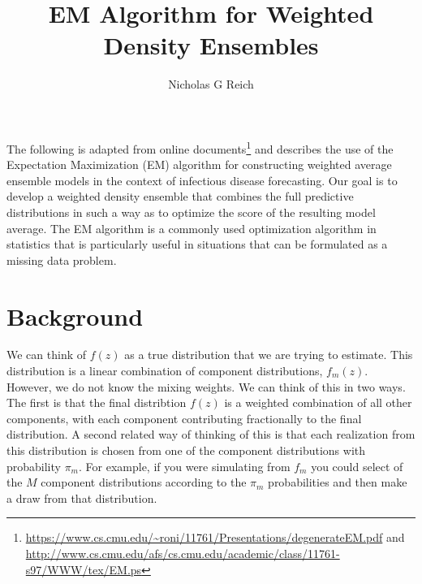\documentclass{article}
\title{EM Algorithm for Weighted Density Ensembles}
\author{Nicholas G Reich}
\begin{document}
\maketitle

The following is adapted from online documents\footnote{\url{https://www.cs.cmu.edu/~roni/11761/Presentations/degenerateEM.pdf} and \url{http://www.cs.cmu.edu/afs/cs.cmu.edu/academic/class/11761-s97/WWW/tex/EM.ps}} and describes the use of the Expectation Maximization (EM) algorithm for constructing weighted average ensemble models in the context of infectious disease forecasting.  
Our goal is to develop a weighted density ensemble that combines the full predictive distributions in such a way as to optimize the score of the resulting model average.
The EM algorithm is a commonly used optimization algorithm in statistics that is particularly useful in situations that can be formulated as a missing data problem.  

\section{Background}
We can think of $f(z)$ as a true distribution that we are trying to estimate. This distribution is a linear combination of component distributions, $f_m(z)$. However, we do not know the mixing weights. We can think of this in two ways. The first is that the final distribtion $f(z)$ is a weighted combination of all other components, with each component contributing fractionally to the final distribution. A second related way of thinking of this is that each realization from this distribution is chosen from one of the component distributions with probability $\pi_m$. For example, if you were simulating from $f_m$ you could select of the $M$ component distributions according to the $\pi_m$ probabilities and then make a draw from that distribution.
\end{document}
